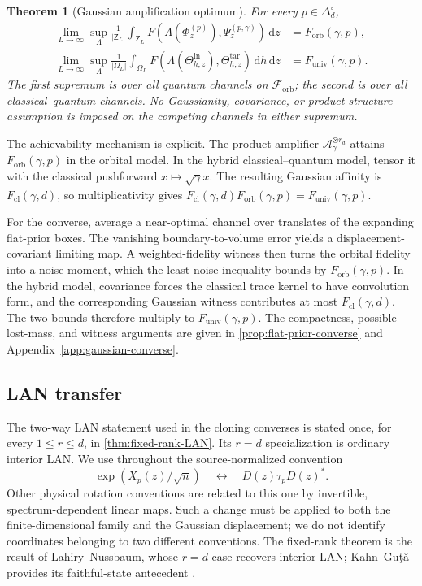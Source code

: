 \documentclass[11pt]{article}
\newtheorem{theorem}{Theorem}[section]
\theoremstyle{remark}
\theoremstyle{plain}
\newcommand{\cA}{\mathcal A}
\newcommand{\cF}{\mathcal F}
\newcommand{\dd}{\mathrm d}
\newcommand{\ot}{\otimes}
\newcommand{\Forb}{F_{\mathrm{orb}}}
\newcommand{\Fcl}{F_{\mathrm{cl}}}
\newcommand{\Funiv}{F_{\mathrm{univ}}}
\begin{document}
\begin{theorem}[Gaussian amplification optimum]
\label{thm:gaussian-amplification}
For every \(p\in\Delta_d^\circ\),
\begin{align}
  \lim_{L\to\infty}\sup_\Lambda
  \frac1{|\mathsf Z_L|}\int_{\mathsf Z_L}
  F\!\left(\Lambda(\Phi_z^{(p)}),\Psi_z^{(p,\gamma)}\right)\,\dd z
  &=\Forb(\gamma,p),
  \label{eq:gaussian-orbital-optimum}\\
  \lim_{L\to\infty}\sup_\Lambda
  \frac1{|\Omega_L|}\int_{\Omega_L}
  F\!\left(\Lambda(\Theta_{h,z}^{\mathrm{in}}),
            \Theta_{h,z}^{\mathrm{tar}}\right)\,\dd h\,\dd z
  &=\Funiv(\gamma,p).
  \label{eq:gaussian-full-optimum}
\end{align}
The first supremum is over all quantum channels on
\(\cF_{\mathrm{orb}}\); the second is over all classical--quantum channels.
No Gaussianity, covariance, or product-structure assumption is imposed on
the competing channels in either supremum.
\end{theorem}

The achievability mechanism is explicit.  The product amplifier
\(\cA_\gamma^{\ot r_d}\) attains \(\Forb(\gamma,p)\) in the orbital model.
In the hybrid classical--quantum model, tensor it with the classical pushforward
\(x\mapsto\sqrt\gamma x\).  The resulting Gaussian affinity is
\(\Fcl(\gamma,d)\), so multiplicativity gives
\(\Fcl(\gamma,d)\Forb(\gamma,p)=\Funiv(\gamma,p)\).

For the converse, average a near-optimal channel over translates of the
expanding flat-prior boxes.  The vanishing boundary-to-volume error yields a
displacement-covariant limiting map.  A weighted-fidelity witness then turns
the orbital fidelity into a noise moment, which the least-noise inequality
bounds by \(\Forb(\gamma,p)\).  In the hybrid model, covariance forces the
classical trace kernel to have convolution form, and the corresponding
Gaussian witness contributes at most \(\Fcl(\gamma,d)\).  The two bounds
therefore multiply to \(\Funiv(\gamma,p)\).  The compactness, possible
lost-mass, and witness arguments are given in
\cref{prop:flat-prior-converse} and Appendix~\ref{app:gaussian-converse}.

\subsection{LAN transfer}
\label{sec:local-asymptotic-normality}

The two-way LAN statement used in the cloning converses is stated once, for
every \(1\le r\le d\), in \cref{thm:fixed-rank-LAN}.  Its \(r=d\)
specialization is ordinary interior LAN.  We use throughout the
source-normalized convention
\[
  \exp\!\left(X_p(z)/\sqrt n\right)
  \quad\longleftrightarrow\quad
  D(z)\tau_pD(z)^*.
\]
Other physical rotation conventions are related to this one by invertible,
spectrum-dependent linear maps.  Such a change must be applied to both the
finite-dimensional family and the Gaussian displacement; we do not identify
coordinates belonging to two different conventions.  The fixed-rank theorem
is the result of Lahiry--Nussbaum, whose \(r=d\) case recovers interior LAN;
Kahn--Gu{\c t}{\u a} provides its faithful-state antecedent
\cite{KahnGuta2009LANFiniteDimensional,LahiryNussbaum2024}.
\end{document}

